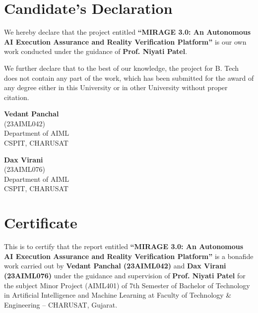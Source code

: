 \documentclass[12pt,a4paper]{report}
\numberwithin{equation}{section}
\begin{document}
\setcounter{page}{1}
\pagestyle{prelim}

\chapter*{Candidate's Declaration}

We hereby declare that the project entitled \textbf{``MIRAGE 3.0: An Autonomous AI Execution Assurance and Reality Verification Platform''} is our own work conducted under the guidance of \textbf{Prof. Niyati Patel}.

\vspace{0.4cm}
We further declare that to the best of our knowledge, the project for B. Tech does not contain any part of the work, which has been submitted for the award of any degree either in this University or in other University without proper citation.

\vspace{2.0cm}
\noindent
\begin{minipage}[t]{0.48\textwidth}
    \textbf{Vedant Panchal}\\
    (23AIML042)\\
    Department of AIML\\
    CSPIT, CHARUSAT
\end{minipage}
\hfill
\begin{minipage}[t]{0.48\textwidth}
    \begin{flushright}
        \textbf{Dax Virani}\\
        (23AIML076)\\
        Department of AIML\\
        CSPIT, CHARUSAT
    \end{flushright}
\end{minipage}

\newpage

\chapter*{Certificate}

This is to certify that the report entitled \textbf{``MIRAGE 3.0: An Autonomous AI Execution Assurance and Reality Verification Platform''} is a bonafide work carried out by \textbf{Vedant Panchal (23AIML042)} and \textbf{Dax Virani (23AIML076)} under the guidance and supervision of \textbf{Prof. Niyati Patel} for the subject Minor Project (AIML401) of 7th Semester of Bachelor of Technology in Artificial Intelligence and Machine Learning at Faculty of Technology \& Engineering -- CHARUSAT, Gujarat.
\end{document}
